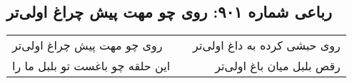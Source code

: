\begin{center}
\section*{رباعی شماره ۹۰۱: روی چو مهت پیش چراغ اولی‌تر}
\label{sec:0901}
\begin{longtable}{l p{0.5cm} r}
روی چو مهت پیش چراغ اولی‌تر
&&
روی حبشی کرده به داغ اولی‌تر
\\
این حلقه چو باغست تو بلبل ما را
&&
رقص بلبل میان باغ اولی‌تر
\\
\end{longtable}
\end{center}
